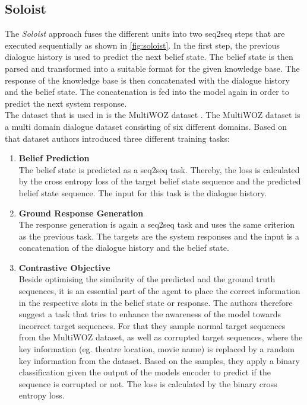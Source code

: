 \documentclass[twocolumn]{tum-article}
\begin{document}
\subsection{Soloist}\label{sec:soloist}
The \textit{Soloist} \cite{peng2020soloist} approach fuses the different units into two seq2seq steps that are executed sequentially as shown in \autoref{fig:soloist}. In the first step, the previous dialogue history is used to predict the next belief state. The belief state is then parsed and transformed into a suitable format for the given knowledge base. The response of the knowledge base is then concatenated with the dialogue history and the belief state. The concatenation is fed into the model again in order to predict the next system response.\\
The dataset that is used in \cite{peng2020soloist} is the MultiWOZ dataset \cite{budzianowski2020multiwoz}. The MultiWOZ dataset is a multi domain dialogue dataset consisting of six different domains. Based on that dataset authors introduced three different training tasks:
\begin{enumerate}
\item \textbf{Belief Prediction}\\
The belief state is predicted as a seq2seq task. Thereby, the loss is calculated by the cross entropy loss of the target belief state sequence and the predicted belief state sequence. The input for this task is the dialogue history. 
\item \textbf{Ground Response Generation}\\
The response generation is again a seq2seq task and uses the same criterion as the previous task. The targets are the system responses and the input is a concatenation of the dialogue history and the belief state.
\item \textbf{Contrastive Objective}\\
Beside optimising the similarity of the predicted and the ground truth sequences, it is an essential part of the agent to place the correct information in the respective slots in the belief state or response. The authors therefore suggest a task that tries to enhance the awareness of the model towards incorrect target sequences. For that they sample normal target sequences from the MultiWOZ dataset, as well as corrupted target sequences, where the key information (eg. theatre location, movie name) is replaced by a random key information from the dataset. Based on the samples, they apply a binary classification given the output of the models encoder to predict if the sequence is corrupted or not. The loss is calculated by the binary cross entropy loss. 
\end{enumerate}
\end{document}
